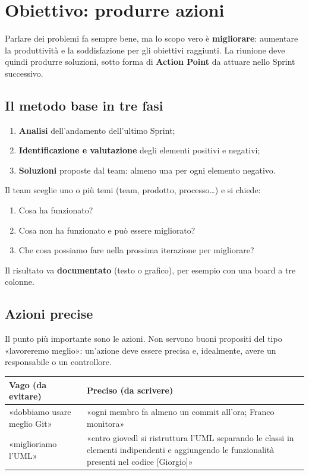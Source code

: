 \documentclass[a4paper,11pt]{article}
\begin{document}
\section{Obiettivo: produrre azioni}
Parlare dei problemi fa sempre bene, ma lo scopo vero è \textbf{migliorare}: aumentare la
produttività e la soddisfazione per gli obiettivi raggiunti. La riunione deve quindi
produrre soluzioni, sotto forma di \textbf{Action Point} da attuare nello Sprint successivo.

\subsection*{Il metodo base in tre fasi}
\begin{enumerate}[nosep]
  \item \textbf{Analisi} dell'andamento dell'ultimo Sprint;
  \item \textbf{Identificazione e valutazione} degli elementi positivi e negativi;
  \item \textbf{Soluzioni} proposte dal team: almeno una per ogni elemento negativo.
\end{enumerate}
Il team sceglie uno o più temi (team, prodotto, processo\ldots) e si chiede:
\begin{enumerate}[nosep]
  \item Cosa ha funzionato?
  \item Cosa non ha funzionato e può essere migliorato?
  \item Che cosa possiamo fare nella prossima iterazione per migliorare?
\end{enumerate}
Il risultato va \textbf{documentato} (testo o grafico), per esempio con una board a tre
colonne.

\subsection*{Azioni precise}
Il punto più importante sono le azioni. Non servono buoni propositi del tipo «lavoreremo
meglio»: un'azione deve essere precisa e, idealmente, avere un responsabile o un controllore.
\begin{center}
\begin{tabular}{|p{5.2cm}|p{10cm}|}
\hline
\textbf{Vago (da evitare)} & \textbf{Preciso (da scrivere)} \\
\hline
«dobbiamo usare meglio Git» & «ogni membro fa almeno un commit all'ora; Franco monitora» \\
\hline
«miglioriamo l'UML» & «entro giovedì si ristruttura l'UML separando le classi in elementi
indipendenti e aggiungendo le funzionalità presenti nel codice [Giorgio]» \\
\hline
\end{tabular}
\end{center}
\end{document}
